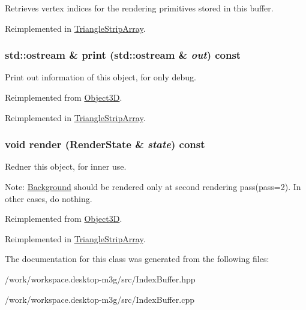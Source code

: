 Retrieves vertex indices for the rendering primitives stored in this buffer. 

Reimplemented in \hyperlink{classm3g_1_1TriangleStripArray_650953afac45099025a524ab160b911f}{TriangleStripArray}.\hypertarget{classm3g_1_1IndexBuffer_6fea17fa1532df3794f8cb39cb4f911f}{
\subsubsection[{print}]{\setlength{\rightskip}{0pt plus 5cm}std::ostream \& print (std::ostream \& {\em out}) const}}
\label{classm3g_1_1IndexBuffer_6fea17fa1532df3794f8cb39cb4f911f}


Print out information of this object, for only debug. 

Reimplemented from \hyperlink{classm3g_1_1Object3D_6fea17fa1532df3794f8cb39cb4f911f}{Object3D}.

Reimplemented in \hyperlink{classm3g_1_1TriangleStripArray_6fea17fa1532df3794f8cb39cb4f911f}{TriangleStripArray}.\hypertarget{classm3g_1_1IndexBuffer_8babc8a79b78615da51161e94029eea9}{
\subsubsection[{render}]{\setlength{\rightskip}{0pt plus 5cm}void render ({\bf RenderState} \& {\em state}) const}}
\label{classm3g_1_1IndexBuffer_8babc8a79b78615da51161e94029eea9}


Redner this object, for inner use.

Note: \hyperlink{classm3g_1_1Background}{Background} should be rendered only at second rendering pass(pass=2). In other cases, do nothing. 

Reimplemented from \hyperlink{classm3g_1_1Object3D_8babc8a79b78615da51161e94029eea9}{Object3D}.

Reimplemented in \hyperlink{classm3g_1_1TriangleStripArray_8babc8a79b78615da51161e94029eea9}{TriangleStripArray}.

The documentation for this class was generated from the following files:\begin{CompactItemize}
\item 
/work/workspace.desktop-m3g/src/IndexBuffer.hpp\item 
/work/workspace.desktop-m3g/src/IndexBuffer.cpp\end{CompactItemize}
